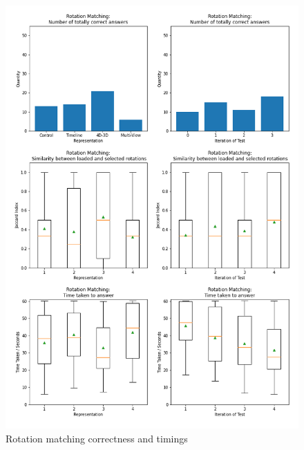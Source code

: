 \documentclass{l4proj}
\begin{document}
\begin{figure}[H]
  \includegraphics[width=\textwidth]{images/results/rotation_matching_stats.png}
  \caption{Rotation matching correctness and timings}
  \label{fig:shape_stats}
\end{figure}
\end{document}
